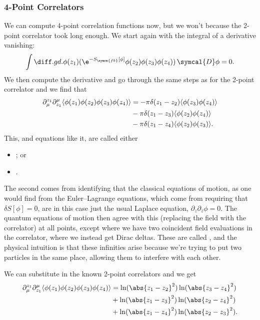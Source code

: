 \documentclass[fleqn]{NotesClass}
\newcommand{\DD}{\,\symcal{D}}
\DeclarePairedDelimiter{\correlator}{\langle}{\rangle}
\newcommand{\freeboson}{\symrm{fb}}
\begin{document}
    \subsubsection{4-Point Correlators}
    We can compute 4-point correlation functions now, but we won't because the 2-point correlator took long enough.
    We start again with the integral of a derivative vanishing:
    \begin{equation}
        \int \diffd{}{\phi(z_1)} (\e^{-S_{\freeboson}[\phi]} \phi(z_2) \phi(z_3) \phi(z_4)) \DD\phi = 0.
    \end{equation}
    We then compute the derivative and go through the same steps as for the 2-point correlator and we find that
    \begin{align}
        \partial_\mu^{z_1} \partial^\mu_{z_1} \correlator{\phi(z_1)\phi(z_2)\phi(z_3)\phi(z_4)} &= -\pi \delta(z_1 - z_2) \correlator{\phi(z_3)\phi(z_4)}\\
        &- \pi \delta(z_1 - z_3) \correlator{\phi(z_2)\phi(z_4)}\\
        &- \pi \delta(z_1 - z_4) \correlator{\phi(z_2)\phi(z_3)}.
    \end{align}
    This, and equations like it, are called either
    \begin{itemize}
        \item {}; or
        \item {}.
    \end{itemize}
    The second comes from identifying that the classical equations of motion, as one would find from the Euler--Lagrange equations, which come from requiring that \(\delta S[\phi] = 0\), are in this case just the usual Laplace equation, \(\partial_z \partial_{\overbar{z}} \phi = 0\).
    The quantum equations of motion then agree with this (replacing the field with the correlator) at all points, except where we have two coincident field evaluations in the correlator, where we instead get Dirac deltas.
    These are called , and the physical intuition is that these infinities arise because we're trying to put two particles in the same place, allowing them to interfere with each other.
    
    We can substitute in the known 2-point correlators and we get
    \begin{align}
        \partial_\mu^{z_1}\partial^\mu_{z_1} \correlator{\phi(z_1)\phi(z_2)\phi(z_3)\phi(z_4)} &= \ln(\abs{z_1 - z_2}^2)\ln(\abs{z_3 - z_4}^2)\\
        &+ \ln(\abs{z_1 - z_3}^2)\ln(\abs{z_2 - z_4}^2)\\
        &+ \ln(\abs{z_1 - z_4}^2)\ln(\abs{z_2 - z_3}^2).
    \end{align}
    
\end{document}
